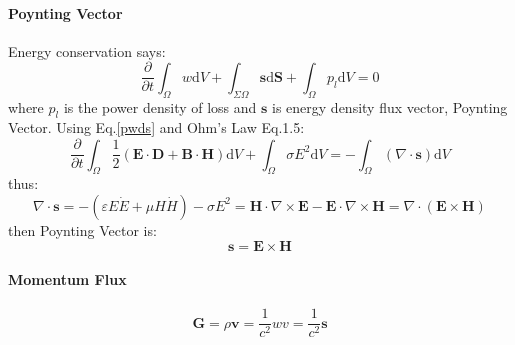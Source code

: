 \documentclass[11pt,a4paper,oneside]{book}
\begin{document}
\paragraph{Poynting Vector}
Energy conservation says:\begin{equation}\label{pwds}
	\frac{\partial}{\partial t}\int_\Omega w\text{d}V+\int_{\Sigma\Omega}\mathbf{s}\text{d}\mathbf{S}+\int_\Omega p_l \text{d}V=0
\end{equation}
where $p_l$ is the power density of loss and $\mathbf{s}$ is energy density flux vector, Poynting Vector. Using Eq.\ref{pwds} and Ohm's Law Eq.1.5:\begin{equation}
	\frac{\partial}{\partial t}\int_\Omega \frac{1}{2}\left(\mathbf{E}\cdot\mathbf{D}+\mathbf{B}\cdot\mathbf{H} \right)\text{d}V+\int_\Omega \sigma E^2 \text{d}V=-\int_{\Omega}\left( \nabla\cdot \mathbf{s}\right)\text{d}V
\end{equation}thus:\begin{equation}
	\nabla\cdot\mathbf{s}=-(\varepsilon E\dot E+\mu H\dot H )-\sigma E^2=\mathbf{H}\cdot\nabla\times\mathbf{E}-\mathbf{E}\cdot\nabla\times\mathbf{H}=\nabla\cdot(\mathbf{E}\times\mathbf{H})
\end{equation}
then Poynting Vector is:\begin{equation}
	\mathbf{s}=\mathbf{E}\times\mathbf{H}
\end{equation}
\paragraph{Momentum Flux}
\begin{equation}
	\mathbf{G}=\rho\mathbf{v}=\frac{1}{c^2}wv=\frac{1}{c^2}\mathbf{s}
\end{equation}
\end{document}
